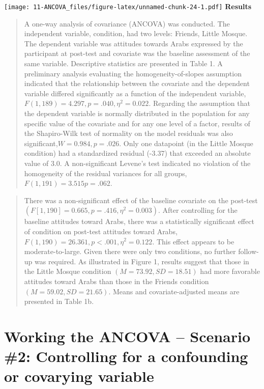 \documentclass[
  11pt,
]{book}
\begin{document}
\texttt{[image: 11-ANCOVA\_files/figure-latex/unnamed-chunk-24-1.pdf]} \textbf{Results}

\begin{quote}
A one-way analysis of covariance (ANCOVA) was conducted. The independent variable, condition, had two levels: Friends, Little Mosque. The dependent variable was attitudes towards Arabs expressed by the participant at post-test and covariate was the baseline assessment of the same variable. Descriptive statistics are presented in Table 1. A preliminary analysis evaluating the homogeneity-of-slopes assumption indicated that the relationship between the covariate and the dependent variable differed significantly as a function of the independent variable, \(F (1, 189) = 4.297, p = .040, \eta^2 = 0.022\). Regarding the assumption that the dependent variable is normally distributed in the population for any specific value of the covariate and for any one level of a factor, results of the Shapiro-Wilk test of normality on the model residuals was also significant,\(W = 0.984, p = .026\). Only one datapoint (in the Little Mosque condition) had a standardized residual (-3.37) that exceeded an absolute value of 3.0. A non-significant Levene's test indicated no violation of the homogeneity of the residual variances for all groups, \(F(1, 191) = 3.515 p = .062\).
\end{quote}

\begin{quote}
There was a non-significant effect of the baseline covariate on the post-test \((F[1, 190] = 0.665, p = .416, \eta^2 = 0.003)\). After controlling for the baseline attitudes toward Arabs, there was a statistically significant effect of condition on post-test attitudes toward Arabs, \(F(1,190) = 26.361, p < .001, \eta^2 = 0.122\). This effect appears to be moderate-to-large. Given there were only two conditions, no further follow-up was required. As illustrated in Figure 1, results suggest that those in the Little Mosque condition \((M = 73.92, SD = 18.51)\) had more favorable attitudes toward Arabs than those in the Friends condition \((M = 59.02, SD = 21.65)\). Means and covariate-adjusted means are presented in Table 1b.
\end{quote}

\hypertarget{working-the-ancova-scenario-2-controlling-for-a-confounding-or-covarying-variable}{%
\section{Working the ANCOVA -- Scenario \#2: Controlling for a confounding or covarying variable}\label{working-the-ancova-scenario-2-controlling-for-a-confounding-or-covarying-variable}}
\end{document}
